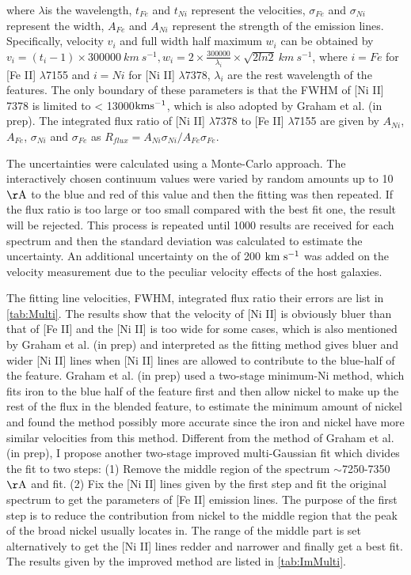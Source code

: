 \documentclass[twocolumn]{aastex631}
\begin{document}
where $\lambda$is the wavelength, $t_{Fe}$ and $t_{Ni}$ represent the velocities, $\sigma_{Fe}$ and $\sigma_{Ni}$ represent the width, $A_{Fe}$ and $A_{Ni}$ represent the strength of the emission lines. Specifically, velocity $v_i$ and full width half maximum $w_i$ can be obtained by $v_i=\left(t_i-1\right)\times300000\ km\ s^{-1}, w_i=2\times\frac{300000}{\lambda_i}\times\sqrt{2ln2}\ km\ s^{-1}$, where $i=Fe$ for [Fe II] $\lambda$7155 and $i=Ni$ for [Ni II] $\lambda7378$, $\lambda_i$ are the rest wavelength of the features. The only boundary of these parameters is that the FWHM of [Ni II] 7378 is limited to < 13000$\rm km s^{-1}$, which is also adopted by Graham et al. (in prep). The integrated flux ratio of [Ni II] $\lambda$7378 to [Fe II] $\lambda$7155 are given by $A_{Ni}$,$A_{Fe}$, $\sigma_{Ni}$ and $\sigma_{Fe}$ as $R_{flux}=A_{Ni}\sigma_{Ni}/A_{Fe}\sigma_{Fe}$.

The uncertainties were calculated using a Monte-Carlo approach. The interactively chosen continuum values were varied by random amounts up to 10 $\rm \AA$ to the blue and red of this value and then the fitting was then repeated. If the flux ratio is too large or too small compared with the best fit one, the result will be rejected. This process is repeated until 1000 results are received for each spectrum and then the standard deviation was calculated to estimate the uncertainty. An additional uncertainty on the of 200 $\rm km\ s^{-1}$ was added on the velocity measurement due to the peculiar velocity effects of the host galaxies.

The fitting line velocities, FWHM, integrated flux ratio their errors are list in \ref{tab:Multi}. The results show that the velocity of [Ni II] is obviously bluer than that of [Fe II] and the [Ni II] is too wide for some cases, which is also mentioned by Graham et al. (in prep) and interpreted as the fitting method gives bluer and wider [Ni II] lines when [Ni II] lines are allowed to contribute to the blue-half of the feature. Graham et al. (in prep) used a two-stage minimum-Ni method, which fits iron to the blue half of the feature first and then allow nickel to make up the rest of the flux in the blended feature, to estimate the minimum amount of nickel and found the method possibly more accurate since the iron and nickel have more similar velocities from this method. Different from the method of Graham et al. (in prep), I propose another two-stage improved multi-Gaussian fit which divides the fit to two steps: (1) Remove the middle region of the spectrum $\sim$7250-7350 $\rm \AA$ and fit. (2) Fix the [Ni II] lines given by the first step and fit the original spectrum to get the parameters of [Fe II] emission lines. The purpose of the first step is to reduce the contribution from nickel to the middle region that the peak of the broad nickel usually locates in. The range of the middle part is set alternatively to get the [Ni II] lines redder and narrower and finally get a best fit. The results given by the improved method are listed in \ref{tab:ImMulti}.
\end{document}
